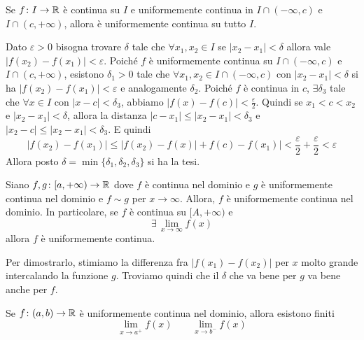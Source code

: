 \documentclass[a4paper]{article}
\begin{document}
\begin{snippettheorem}{}
    Se \(f\colon I \to \mathbb{R}\) è continua su \(I\) e uniformemente continua in \(I\cap(-\infty, c)\)
    e \(I\cap(c, +\infty)\), allora è uniformemente continua su tutto \(I\).
\end{snippettheorem}

\begin{snippetproof}{}
    Dato \(\varepsilon > 0\) bisogna trovare \(\delta\) tale che \(\forall x_1, x_2 \in I\) se \(|x_2-x_1|<\delta\)
    allora vale \(|f(x_2) - f(x_1)| < \varepsilon\).
    Poiché \(f\) è uniformemente continua su \(I\cap(-\infty, c)\)
    e \(I\cap(c, +\infty)\), esistono \(\delta_1>0\) tale che \(\forall x_1, x_2 \in I\cap(-\infty, c)\)
    con \(|x_2-x_1|<\delta\) si ha \(|f(x_2) - f(x_1)| < \varepsilon\) e analogamente \(\delta_2\).
    Poiché \(f\) è continua in \(c\), \(\exists \delta_3\) tale che \(\forall x \in I\) con \(|x-c|<\delta_3\),
    abbiamo \(|f(x) - f(c)| < \frac{\varepsilon}{2}\).
    Quindi se \(x_1 < c < x_2\) e \(|x_2 - x_1| < \delta\), allora la distanza \(|c-x_1| \leq |x_2-x_1| < \delta_3\)
    e \(|x_2 - c| \leq |x_2 - x_1| < \delta_3\).
    E quindi
    \[
        |f(x_2) - f(x_1)| \leq |f(x_2) - f(x)| + f(c) - f(x_1)| < \frac{\varepsilon}{2} + \frac{\varepsilon}{2} < \varepsilon
    \]
    Allora posto \(\delta = \min\{\delta_1, \delta_2, \delta_3\}\) si ha la tesi.
\end{snippetproof}

\begin{snippetproposition}{}
    Siano \(f,g\colon [a, +\infty) \to \mathbb{R}\) dove \(f\) è continua nel dominio
    e \(g\) è uniformemente continua nel dominio
    e \(f\sim g\) per \(x\to\infty\).
    Allora, \(f\) è uniformemente continua nel dominio.
    In particolare, se \(f\) è continua su \([A, +\infty)\) e
    \[
        \exists\, \lim_{x\to\infty} f(x)
    \]
    allora \(f\) è uniformemente continua.
\end{snippetproposition}

Per dimostrarlo, stimiamo la differenza fra \(|f(x_1) - f(x_2)|\)
per \(x\) molto grande intercalando la funzione \(g\). Troviamo quindi che il \(\delta\) che va
bene per \(g\) va bene anche per \(f\).

\begin{snippetproposition}{}
    Se \(f\colon (a,b) \to \mathbb{R}\) è uniformemente continua nel dominio, allora
    esistono finiti
    \[
        \lim_{x\to a^+}f(x) \qquad \lim_{x\to b^-} f(x)
    \]
\end{snippetproposition}
\end{document}
